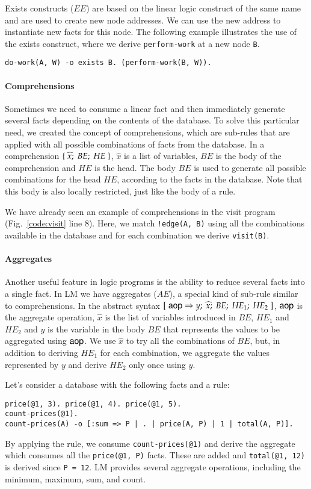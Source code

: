 Exists constructs ($EE$) are based on the linear logic construct of the same name and are used to create new node addresses.
We can use the new address to instantiate new facts for this node.  
The following example illustrates the use of the exists construct, where we derive
\texttt{perform-work} at a new node \texttt{B}.

\begin{Verbatim}
do-work(A, W) -o exists B. (perform-work(B, W)).
\end{Verbatim}

\paragraph{Comprehensions}

Sometimes we need to consume a linear fact and then immediately generate several facts depending on
the contents of the database. To solve this particular need, we created the concept of comprehensions, which are
sub-rules that are applied with all possible combinations of facts from the database. In a comprehension $\{ \; \widehat{x}; \; BE; \; HE \; \}$, $\widehat{x}$ is a list of variables, $BE$ is the body of the comprehension and $HE$ is the head.
The body $BE$ is used to generate all possible combinations for the head $HE$, according to the facts
in the database. Note that this body is also locally restricted, just like the body of a rule. 

We have already seen an example of comprehensions in the visit program (Fig.~\ref{code:visit} line 8).
Here, we match \texttt{!edge(A, B)} using all the combinations available in the database and for each combination we derive \texttt{visit(B)}.

\paragraph{Aggregates}

Another useful feature in logic programs is the ability to reduce several facts into a single fact.
In LM we have aggregates ($AE$), a special kind of sub-rule similar to comprehensions.
In the abstract syntax $[\;\mathsf{aop} \Rightarrow y; \; \widehat{x}; \; BE; \; HE_1; \; HE_2 \;]$, $\mathsf{aop}$ is the aggregate operation, $\widehat{x}$ is the list of variables
introduced in $BE$, $HE_1$ and $HE_2$ and $y$ is the variable in the body
$BE$ that represents the values to be aggregated using $\mathsf{aop}$.
We use $\widehat{x}$ to try all the combinations of $BE$, but, in addition to deriving $HE_1$ for each combination,
we aggregate the values represented by $y$ and derive $HE_2$ only once using $y$.

Let's consider a database with the following facts and a rule:

\begin{Verbatim}
price(@1, 3). price(@1, 4). price(@1, 5).
count-prices(@1).
count-prices(A) -o [:sum => P | . | price(A, P) | 1 | total(A, P)].
\end{Verbatim}

By applying the rule, we consume \texttt{count-prices(@1)} and
derive the aggregate which consumes all the \texttt{price(@1, P)} facts.
These are added and \texttt{total(@1,~12)} is derived since \texttt{P~=~12}.
LM provides several aggregate operations, including the minimum, maximum, sum, and count.
